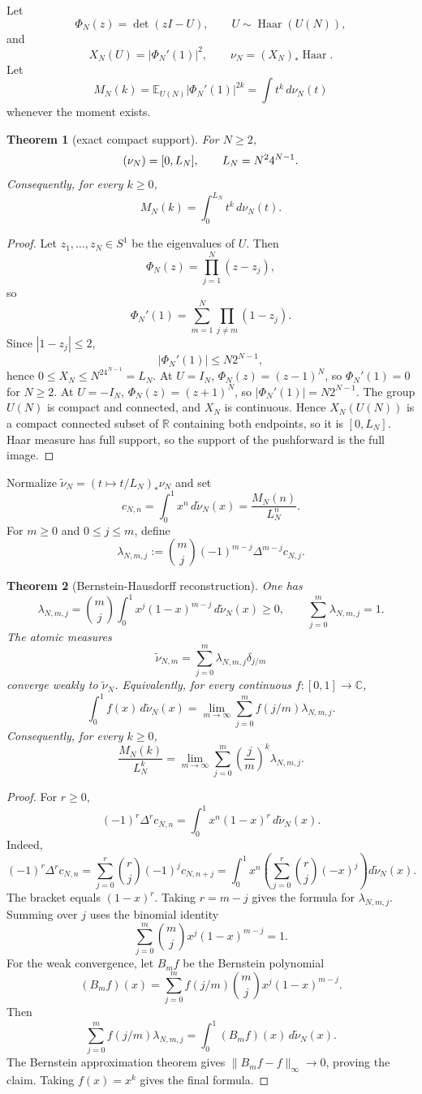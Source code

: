 \documentclass[11pt]{article}
\newtheorem{theorem}{Theorem}[section]
\let\supp\relax
\DeclareMathOperator{\supp}{supp}
\newcommand{\C}{\mathbb C}
\newcommand{\R}{\mathbb R}
\newcommand{\Haar}{\operatorname{Haar}}
\begin{document}
Let
\[
\Phi_N(z)=\det(zI-U),\qquad U\sim\Haar(U(N)),
\]
and
\[
X_N(U)=|\Phi_N'(1)|^2,
\qquad
\nu_N=(X_N)_*\Haar.
\]
Let
\[
M_N(k)=\mathbb E_{U(N)}|\Phi_N'(1)|^{2k}=\int t^k\,d\nu_N(t)
\]
whenever the moment exists.

\begin{theorem}[exact compact support]
For $N\ge2$,
\[
\supp(\nu_N)=[0,L_N],
\qquad
L_N=N^24^{N-1}.
\]
Consequently, for every $k\ge0$,
\[
M_N(k)=\int_0^{L_N}t^k\,d\nu_N(t).
\]
\end{theorem}

\begin{proof}
Let $z_1,\dots,z_N\in S^1$ be the eigenvalues of $U$.  Then
\[
\Phi_N(z)=\prod_{j=1}^N(z-z_j),
\]
so
\[
\Phi_N'(1)=\sum_{m=1}^N\prod_{j\ne m}(1-z_j).
\]
Since $|1-z_j|\le2$,
\[
|\Phi_N'(1)|\le N2^{N-1},
\]
hence $0\le X_N\le N^24^{N-1}=L_N$.
At $U=I_N$, $\Phi_N(z)=(z-1)^N$, so $\Phi_N'(1)=0$ for $N\ge2$.
At $U=-I_N$, $\Phi_N(z)=(z+1)^N$, so $|\Phi_N'(1)|=N2^{N-1}$.
The group $U(N)$ is compact and connected, and $X_N$ is continuous.  Hence
$X_N(U(N))$ is a compact connected subset of $\R$ containing both endpoints, so it
is $[0,L_N]$.  Haar measure has full support, so the support of the pushforward is
the full image.
\end{proof}

Normalize $\widetilde\nu_N=(t\mapsto t/L_N)_*\nu_N$ and set
\[
c_{N,n}=\int_0^1x^n\,d\widetilde\nu_N(x)=\frac{M_N(n)}{L_N^n}.
\]
For $m\ge0$ and $0\le j\le m$, define
\[
\lambda_{N,m,j}:=\binom mj(-1)^{m-j}\Delta^{m-j}c_{N,j}.
\]

\begin{theorem}[Bernstein-Hausdorff reconstruction]
One has
\[
\lambda_{N,m,j}=\binom mj\int_0^1x^j(1-x)^{m-j}\,d\widetilde\nu_N(x)\ge0,
\qquad
\sum_{j=0}^m\lambda_{N,m,j}=1.
\]
The atomic measures
\[
\widetilde\nu_{N,m}=\sum_{j=0}^m\lambda_{N,m,j}\delta_{j/m}
\]
converge weakly to $\widetilde\nu_N$.  Equivalently, for every continuous
$f:[0,1]\to\C$,
\[
\int_0^1 f(x)\,d\widetilde\nu_N(x)
=\lim_{m\to\infty}\sum_{j=0}^m f(j/m)\lambda_{N,m,j}.
\]
Consequently, for every $k\ge0$,
\[
\frac{M_N(k)}{L_N^k}=\lim_{m\to\infty}\sum_{j=0}^m\left(\frac jm\right)^k\lambda_{N,m,j}.
\]
\end{theorem}

\begin{proof}
For $r\ge0$,
\[
(-1)^r\Delta^r c_{N,n}=\int_0^1x^n(1-x)^r\,d\widetilde\nu_N(x).
\]
Indeed,
\[
(-1)^r\Delta^r c_{N,n}
=\sum_{j=0}^r\binom rj(-1)^j c_{N,n+j}
=\int_0^1x^n\left(\sum_{j=0}^r\binom rj(-x)^j\right)d\widetilde\nu_N(x).
\]
The bracket equals $(1-x)^r$.  Taking $r=m-j$ gives the formula for
$\lambda_{N,m,j}$.  Summing over $j$ uses the binomial identity
\[
\sum_{j=0}^m\binom mjx^j(1-x)^{m-j}=1.
\]
For the weak convergence, let $B_mf$ be the Bernstein polynomial
\[
(B_mf)(x)=\sum_{j=0}^m f(j/m)\binom mjx^j(1-x)^{m-j}.
\]
Then
\[
\sum_{j=0}^m f(j/m)\lambda_{N,m,j}=\int_0^1(B_mf)(x)\,d\widetilde\nu_N(x).
\]
The Bernstein approximation theorem gives $\|B_mf-f\|_\infty\to0$, proving the
claim.  Taking $f(x)=x^k$ gives the final formula.
\end{proof}
\end{document}
